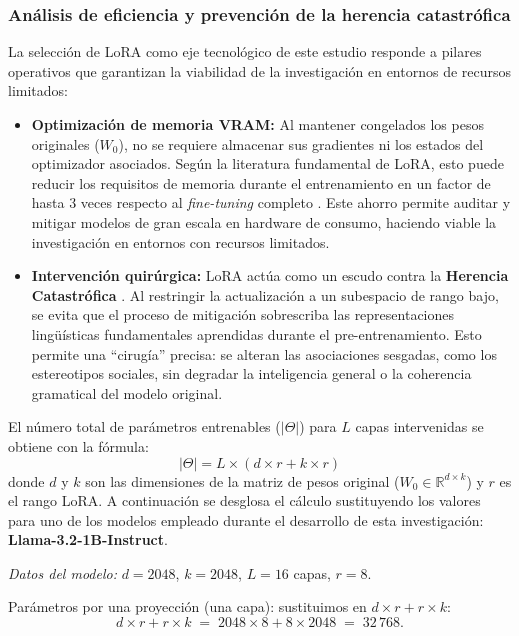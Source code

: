\documentclass[12pt,a4paper]{report}
\begin{document}
\subsubsection{Análisis de eficiencia y prevención de la herencia catastrófica}
\label{par:ventajas_lora_detallado}

La selección de LoRA como eje tecnológico de este estudio responde a pilares operativos que garantizan la viabilidad de la investigación en entornos de recursos limitados:

\begin{itemize}
    \item \textbf{Optimización de memoria VRAM:} Al mantener congelados los pesos originales ($W_0$), no se requiere almacenar sus gradientes ni los estados del optimizador asociados. Según la literatura fundamental de LoRA, esto puede reducir los requisitos de memoria durante el entrenamiento en un factor de hasta 3 veces respecto al \textit{fine-tuning} completo \cite{hu_lora_2021}. Este ahorro permite auditar y mitigar modelos de gran escala en hardware de consumo, haciendo viable la investigación en entornos con recursos limitados.
    \item \textbf{Intervención quirúrgica:} LoRA actúa como un escudo contra la \textbf{Herencia Catastrófica} \cite{chang_ba-lora_2025}. Al restringir la actualización a un subespacio de rango bajo, se evita que el proceso de mitigación sobrescriba las representaciones lingüísticas fundamentales aprendidas durante el pre-entrenamiento. Esto permite una ``cirugía'' precisa: se alteran las asociaciones sesgadas, como los estereotipos sociales, sin degradar la inteligencia general o la coherencia gramatical del modelo original.
\end{itemize}

El número total de parámetros entrenables ($|\Theta|$) para $L$ capas intervenidas se obtiene con la fórmula:
\begin{equation}
|\Theta| = L \times (d \times r + k \times r)
\end{equation}
donde $d$ y $k$ son las dimensiones de la matriz de pesos original ($W_0 \in \mathbb{R}^{d \times k}$) y $r$ es el rango LoRA. A continuación se desglosa el cálculo sustituyendo 
los valores para uno de los modelos empleado durante el desarrollo de esta investigación: \textbf{Llama-3.2-1B-Instruct}.

\textit{Datos del modelo:} $d = 2048$, $k = 2048$, $L = 16$ capas, $r = 8$.

Parámetros por una proyección (una capa): sustituimos en $d \times r + r \times k$:
\begin{equation*}
d \times r + r \times k \;=\; 2048 \times 8 + 8 \times 2048 \;=\; 32\,768.
\end{equation*}
\end{document}
